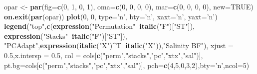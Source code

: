 \documentclass[11pt,]{article}
\newenvironment{Shaded}{\begin{snugshade}}{\end{snugshade}}
\newcommand{\KeywordTok}[1]{\textcolor[rgb]{0.13,0.29,0.53}{\textbf{#1}}}
\newcommand{\DataTypeTok}[1]{\textcolor[rgb]{0.13,0.29,0.53}{#1}}
\newcommand{\DecValTok}[1]{\textcolor[rgb]{0.00,0.00,0.81}{#1}}
\newcommand{\FloatTok}[1]{\textcolor[rgb]{0.00,0.00,0.81}{#1}}
\newcommand{\StringTok}[1]{\textcolor[rgb]{0.31,0.60,0.02}{#1}}
\newcommand{\OtherTok}[1]{\textcolor[rgb]{0.56,0.35,0.01}{#1}}
\newcommand{\OperatorTok}[1]{\textcolor[rgb]{0.81,0.36,0.00}{\textbf{#1}}}
\newcommand{\NormalTok}[1]{#1}
\begin{document}
\begin{Shaded}
\begin{Highlighting}[]
\NormalTok{opar <-}\StringTok{ }\KeywordTok{par}\NormalTok{(}\DataTypeTok{fig=}\KeywordTok{c}\NormalTok{(}\DecValTok{0}\NormalTok{, }\DecValTok{1}\NormalTok{, }\DecValTok{0}\NormalTok{, }\DecValTok{1}\NormalTok{), }\DataTypeTok{oma=}\KeywordTok{c}\NormalTok{(}\DecValTok{0}\NormalTok{, }\DecValTok{0}\NormalTok{, }\DecValTok{0}\NormalTok{, }\DecValTok{0}\NormalTok{),}
            \DataTypeTok{mar=}\KeywordTok{c}\NormalTok{(}\DecValTok{0}\NormalTok{, }\DecValTok{0}\NormalTok{, }\DecValTok{0}\NormalTok{, }\DecValTok{0}\NormalTok{), }\DataTypeTok{new=}\OtherTok{TRUE}\NormalTok{)}
\KeywordTok{on.exit}\NormalTok{(}\KeywordTok{par}\NormalTok{(opar))}
\KeywordTok{plot}\NormalTok{(}\DecValTok{0}\NormalTok{, }\DecValTok{0}\NormalTok{, }\DataTypeTok{type=}\StringTok{'n'}\NormalTok{, }\DataTypeTok{bty=}\StringTok{'n'}\NormalTok{, }\DataTypeTok{xaxt=}\StringTok{'n'}\NormalTok{, }\DataTypeTok{yaxt=}\StringTok{'n'}\NormalTok{)}
\KeywordTok{legend}\NormalTok{(}\StringTok{"top"}\NormalTok{,}\KeywordTok{c}\NormalTok{(}\KeywordTok{expression}\NormalTok{(}\StringTok{"Permutation"}\OperatorTok{~}\KeywordTok{italic}\NormalTok{(}\StringTok{"F"}\NormalTok{)[}\StringTok{"ST"}\NormalTok{]),}
         \KeywordTok{expression}\NormalTok{(}\StringTok{"Stacks"}\OperatorTok{~}\KeywordTok{italic}\NormalTok{(}\StringTok{"F"}\NormalTok{)[}\StringTok{"ST"}\NormalTok{]),}
         \StringTok{"PCAdapt"}\NormalTok{,}\KeywordTok{expression}\NormalTok{(}\KeywordTok{italic}\NormalTok{(}\StringTok{"X"}\NormalTok{)}\OperatorTok{^}\NormalTok{T}\OperatorTok{~}\KeywordTok{italic}\NormalTok{(}\StringTok{"X"}\NormalTok{)),}\StringTok{"Salinity BF"}\NormalTok{),}
       \DataTypeTok{xjust =} \FloatTok{0.5}\NormalTok{,}\DataTypeTok{x.intersp =} \FloatTok{0.5}\NormalTok{,}
       \DataTypeTok{col =}\NormalTok{ cols[}\KeywordTok{c}\NormalTok{(}\StringTok{"perm"}\NormalTok{,}\StringTok{"stacks"}\NormalTok{,}\StringTok{"pc"}\NormalTok{,}\StringTok{"xtx"}\NormalTok{,}\StringTok{"sal"}\NormalTok{)],}
       \DataTypeTok{pt.bg=}\NormalTok{cols[}\KeywordTok{c}\NormalTok{(}\StringTok{"perm"}\NormalTok{,}\StringTok{"stacks"}\NormalTok{,}\StringTok{"pc"}\NormalTok{,}\StringTok{"xtx"}\NormalTok{,}\StringTok{"sal"}\NormalTok{)],}
       \DataTypeTok{pch=}\KeywordTok{c}\NormalTok{(}\DecValTok{4}\NormalTok{,}\DecValTok{5}\NormalTok{,}\DecValTok{0}\NormalTok{,}\DecValTok{3}\NormalTok{,}\DecValTok{2}\NormalTok{),}\DataTypeTok{bty=}\StringTok{'n'}\NormalTok{,}\DataTypeTok{ncol=}\DecValTok{5}\NormalTok{)}
\end{Highlighting}
\end{Shaded}
\end{document}
